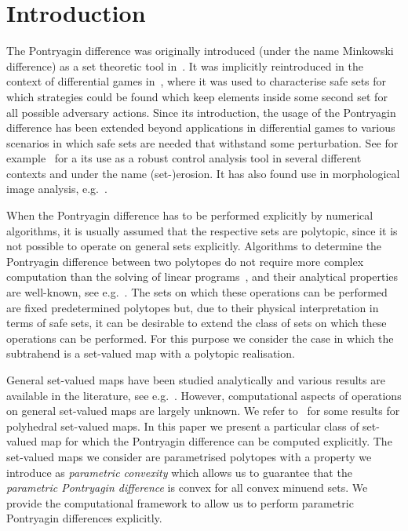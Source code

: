 \documentclass[smallextended]{svjour3}       %
\numberwithin{equation}{section}
\begin{document}

\section{Introduction}
%
The Pontryagin difference was originally introduced (under the 
name Minkowski difference) as a set theoretic tool
in~\cite{Hadwiger:1950,Hadwiger:1957}. 
%
It was implicitly reintroduced in the context of
differential games in~\cite{Pontryagin:1966}, where it was used to characterise safe sets for which strategies could be found which keep elements inside some second set for all possible adversary actions.
%
Since its introduction, the usage of the Pontryagin difference has been extended beyond applications in differential games to various scenarios in which safe sets are needed that withstand some perturbation.
%
See for example~\cite{blanchini:2007} for a its use as a robust
control analysis tool in several different contexts and under the name
(set-)erosion. It has also found use in morphological image analysis, e.g.~\cite{Haralick:1987}.
%

When the Pontryagin difference has to be performed explicitly by numerical algorithms, it is usually assumed that the respective sets are polytopic, since it is not possible to operate on general sets explicitly.
%
Algorithms to determine the Pontryagin difference between two
polytopes do not require more complex computation than the solving of
linear programs~\cite{Kolmanovsky:1998,Kerrigan:2003}, and their
analytical properties are well-known, see e.g.~\cite{blanchini:2007,Haralick:1987,Kolmanovsky:1998}.
%
The sets on which these operations can be performed are fixed
predetermined polytopes but, due to their physical interpretation in
terms of safe sets, it can be desirable to extend the class of sets on which these operations can be performed.
%
For this purpose we consider the case in which the subtrahend is a
set-valued map with a polytopic realisation.

General set-valued maps have been studied analytically and various results are available in the literature, see e.g.~\cite{Aubin:2009}.
%
However, computational aspects of operations on general set-valued
maps are largely unknown. We refer to~\cite{Finzel:2000} for some results for polyhedral set-valued maps.
%
In this paper we present a particular class of set-valued map for which the Pontryagin difference can be computed explicitly.
%
The set-valued maps we consider are parametrised polytopes with a property we introduce as \emph{parametric convexity} which allows us to guarantee that the \emph{parametric Pontryagin difference} is convex for all convex minuend sets.
%
We provide the computational framework to allow us to perform parametric Pontryagin differences explicitly.
\end{document}
